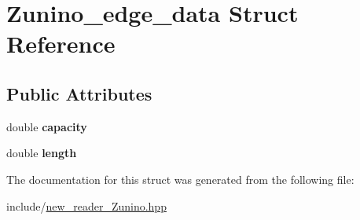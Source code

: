\hypertarget{structZunino__edge__data}{
\section{Zunino\_\-edge\_\-data Struct Reference}
\label{structZunino__edge__data}
}
\subsection*{Public Attributes}
\begin{DoxyCompactItemize}
\item 
\hypertarget{structZunino__edge__data_a73441af93ae1f5b358840404cfa6e0e3}{
double {\bfseries capacity}}
\label{structZunino__edge__data_a73441af93ae1f5b358840404cfa6e0e3}

\item 
\hypertarget{structZunino__edge__data_af9a655836071f05edf61648d3d2c5258}{
double {\bfseries length}}
\label{structZunino__edge__data_af9a655836071f05edf61648d3d2c5258}

\end{DoxyCompactItemize}


The documentation for this struct was generated from the following file:\begin{DoxyCompactItemize}
\item 
include/\hyperlink{new__reader__Zunino_8hpp}{new\_\-reader\_\-Zunino.hpp}\end{DoxyCompactItemize}
